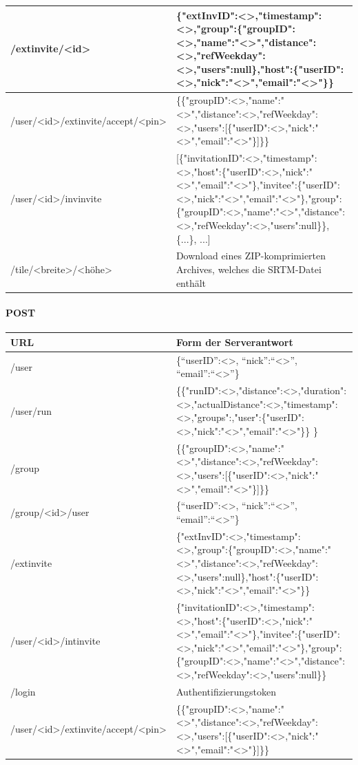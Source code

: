 \begin{center}
\begin{longtable}{| p{4.1cm} | p{10cm} |}
\hline
/extinvite/<id> & \{"extInvID":<>,"timestamp":<>,"group":\-\{"groupID":<>,"name":"<>","distance":<>,\-"refWeekday":<>,"users":null\},"host":\{"userID":<>,\-"nick":"<>","email":"<>"\}\} \\
\hline
/user/<id>/extinvite/\-accept/<pin> & \{\{"groupID":<>,"name":"<>","distance":<>,"\-refWeekday":<>,"users":[\{"userID":<>,"nick":"<>",\-"email":"<>"\}]\}\} \\
\hline
/user/<id>/invinvite & [\{"invitationID":<>,"timestamp":<>,"host":\-\{"userID":<>,"nick":"<>","email":"<>"\},"invitee":\-\{"userID":<>,"nick":"<>","email":"<>"\},"group":\-\{"groupID":<>,"name":"<>","distance":<>,\-"refWeekday":<>,"users":null\}\}, \{...\}, ...] \\
\hline
/tile/<breite>/<höhe> & Download eines ZIP-komprimierten Archives, welches die SRTM-Datei enthält \\
\hline
\end{longtable}
\end{center}

\paragraph{POST}
\begin{center}
\begin{longtable}{| p{4.1cm} | p{10cm} |}
\hline
URL & Form der Serverantwort \\
\hline \hline
/user & \{``userID'':<>, ``nick'':``<>'', ``email'':``<>''\} \\
\hline
/user/run & \{\{"runID":<>,"distance":<>,"duration":<>,\-"actualDistance":<>,"timestamp":<>,"groups":,"user":\-\{"userID":<>,"nick":"<>","email":"<>"\}\} \} \\
\hline
/group & \{\{"groupID":<>,"name":"<>","distance":<>,"\-refWeekday":<>,"users":[\{"userID":<>,"nick":"<>",\-"email":"<>"\}]\}\} \\
\hline
/group/<id>/user & \{``userID'':<>, ``nick'':``<>'', ``email'':``<>''\} \\
\hline
/extinvite & \{"extInvID":<>,"timestamp":<>,"group":\-\{"groupID":<>,"name":"<>","distance":<>,\-"refWeekday":<>,"users":null\},"host":\{"userID":<>,\-"nick":"<>","email":"<>"\}\} \\
\hline
/user/<id>/intinvite & \{"invitationID":<>,"timestamp":<>,"host":\-\{"userID":<>,"nick":"<>","email":"<>"\},"invitee":\-\{"userID":<>,"nick":"<>","email":"<>"\},"group":\-\{"groupID":<>,"name":"<>","distance":<>,\-"refWeekday":<>,"users":null\}\} \\
\hline
/login & Authentifizierungstoken \\
\hline
/user/<id>/extinvite/\-accept/<pin> & \{\{"groupID":<>,"name":"<>","distance":<>,"\-refWeekday":<>,"users":[\{"userID":<>,"nick":"<>",\-"email":"<>"\}]\}\} \\
\hline
\end{longtable}
\end{center}


